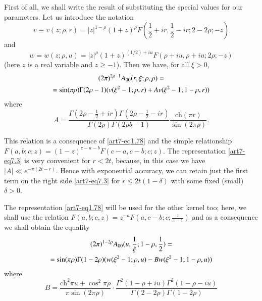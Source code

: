First of all, we shall write the result of substituting the special values for our parameters. Let us introduce the notation 
\setcounter{section}{7}
\setcounter{equation}{0}
\begin{equation}
v \equiv v (z; \rho, r) = |z|^{1-\rho} (1+z)^\rho F (\frac{1}{2} + ir, \frac{1}{2} - ir; 2 - 2 \rho ; - z)  \label{art7-eq7.1}
\end{equation}
and 
\begin{equation}
 w=w (z; \rho, u) =  |z|^\rho (1+z)^{(1/2) + iu} F (\rho + iu, \rho + iu; 2 \rho; - z) \label{art7-eq7.2}
\end{equation}
(here $z$ is a real variable and $z \geqslant -1$). Then we have, for all $\xi > 0$,
\begin{gather}
(2\pi)^{2 \rho-1} A_{00} (r, \xi; \rho, \rho) = \label{art7-eq7.3}\\
= \sin (\pi \rho) \Gamma (2\rho -1) (v (\xi^2 -1; \rho, r) + A v (\xi^2 -1; 1-\rho, r))\notag
\end{gather}
where
\begin{equation}
A = \frac{\Gamma (2 \rho - \frac{1}{2} + ir) \Gamma (2 \rho -\frac{1}{2} - ir)}{\Gamma (2\rho)\Gamma (2 \rho b-1)} \frac{\text{ch} (\pi r)}{\sin (2 \pi \rho)}. 
\label{art7-eq7.4}
\end{equation}

This relation is a consequence of \eqref{art7-eq1.78} and the simple relationship $F(a, b; c; z) = (1-z)^{c-a-b} F (c-a, c-b; c;z)$. The representation \eqref{art7-eq7.3} is very convenient for $r < 2 t$, because,  in this case we have $|A| \ll e^{-\pi (2t-r)}$. Hence with exponential accuracy, we can retain just the first term on the right side \eqref{art7-eq7.3} for $r \leqslant 2t (1-\delta)$ with some fixed (small) $\delta >0$.

The representation \eqref{art7-eq1.78} will be used for the other kernel too; here, we shall use the relation $F(a, b; c,z) = z^{-a} F(a, c-b; c; \frac{z}{z-1})$ and as a consequence we shall obtain the equality
\begin{gather}
(2\pi)^{1-2\rho} A_{00} (u , \frac{1}{\xi}; 1 -\rho, \frac{1}{2}) = \label{art7-eq7.5}\\
= \sin (\pi \rho) \Gamma (1 -2 \rho) (w (\xi^2 -1; \rho, u) - Bw(\xi^2 - 1; 1 -\rho,u)) \notag
\end{gather}
where
\begin{equation}
B = \frac{\text{ch}^2 \pi u+ \cos^2 \pi \rho}{\pi \sin (2 \pi \rho)} \cdot \frac{\Gamma^2 (1-\rho+ iu) \Gamma^2 (1-\rho - iu)}{\Gamma (2-2\rho) \Gamma (1-2 \rho)}
\label{art7-eq7.6}
\end{equation}

